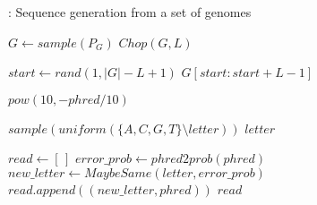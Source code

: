 \begin{algorithm}[H]
	\caption{\completem: Sequence generation from a set of genomes}\label{complete_model_sequence_generation}
	\begin{algorithmic}[1]
			\State $G \gets sample(P_G)$  
			\Return $Chop(G, L)$
		\EndFunction

		\Statex

			\State $start \gets rand(1, \lvert G \rvert - L + 1)$
			\Return $G[start : start + L - 1]$  
		\EndFunction

		\Statex

			\Return $\mathit{pow}(10, - \mathit{phred}/10)$
		\EndFunction

		\Statex
		
				\Return $\mathit{sample}(\mathit{uniform}(\{A, C, G, T\} \setminus \mathit{letter}))$
			\Else
				\Return $\mathit{letter}$
			\EndIf
		\EndFunction

			\State $read \gets [\,]$ 
				\State $\mathit{error\_prob} \gets \mathit{phred2prob}(\mathit{phred})$
				\State $\mathit{new\_letter} \gets \mathit{MaybeSame}(letter, error\_prob)$
				\State $\mathit{read.append}((\mathit{new\_letter}, \mathit{phred}))$
			\EndFor
			\Return $\mathit{read}$
		\EndFunction
	\end{algorithmic}
\end{algorithm}

